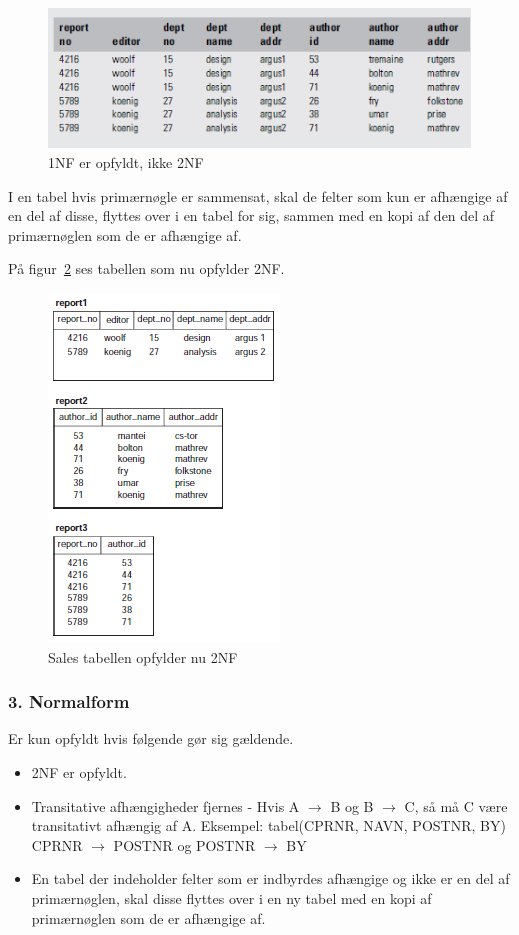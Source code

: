 \begin{figure}[H]
	\centering
	\includegraphics[width=0.8\linewidth]{figs/spm5/not2NF.PNG}
	\caption{1NF er opfyldt, ikke 2NF}
	\label{fig:not2NF}
\end{figure}
	
I en tabel hvis primærnøgle er sammensat, skal de felter som kun er afhængige af en del af disse, flyttes over i en tabel for sig, sammen med en kopi af den del af primærnøglen som de er afhængige af.

På figur~\ref{fig:2NF} ses tabellen som nu opfylder 2NF. 

\begin{figure}[H]
	\centering
	\includegraphics[width=0.5\linewidth]{figs/spm5/2NF.PNG}
	\caption{Sales tabellen opfylder nu 2NF}
	\label{fig:2NF}
\end{figure}
	
\subsubsection{3. Normalform} 
Er kun opfyldt hvis følgende gør sig gældende.

\begin{itemize}
	\item 2NF er opfyldt.
	\item Transitative afhængigheder fjernes - Hvis A $\rightarrow$ B og B $\rightarrow$ C, så må C være transitativt afhængig af A. Eksempel:
	tabel(CPRNR, NAVN, POSTNR, BY)\\
	CPRNR $\rightarrow$ POSTNR og POSTNR $\rightarrow$ BY
	\item En tabel der indeholder felter som er indbyrdes afhængige og ikke er en del af primærnøglen, skal disse flyttes over i en ny tabel med en kopi af primærnøglen som de er afhængige af.
\end{itemize}
	
